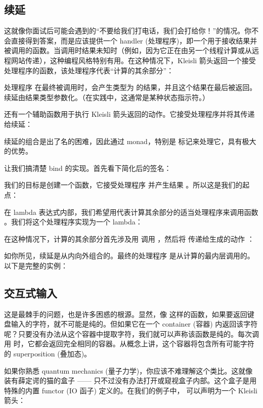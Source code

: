 \subsection{续延}

这就像你面试后可能会遇到的“不要给我们打电话，我们会打给你！”的情况。你不会直接得到答案，而是应该提供一个 handler (处理程序)，即一个用于接收结果并被调用的函数。当调用时结果未知时（例如，因为它正在由另一个线程计算或从远程网站传递），这种编程风格特别有用。在这种情况下，Kleisli 箭头返回一个接受处理程序的函数，该处理程序代表“计算的其余部分”：

处理程序  在最终被调用时，会产生类型为  的结果，并且这个结果在最后被返回。续延由结果类型参数化。（在实践中，这通常是某种状态指示符。）

还有一个辅助函数用于执行 Kleisli 箭头返回的动作。它接受处理程序并将其传递给续延：

续延的组合是出了名的困难，因此通过 monad，特别是  标记来处理它，具有极大的优势。

让我们搞清楚 bind 的实现。首先看下简化后的签名：

我们的目标是创建一个函数，它接受处理程序  并产生结果 。所以这是我们的起点：

在 lambda 表达式内部，我们希望用代表计算其余部分的适当处理程序来调用函数 。我们将这个处理程序实现为一个 lambda：

在这种情况下，计算的其余部分首先涉及用  调用 ，然后将  传递给生成的动作 ：

如你所见，续延是从内向外组合的。最终的处理程序  是从计算的最内层调用的。以下是完整的实例：


\subsection{交互式输入}

这是最棘手的问题，也是许多困惑的根源。显然，像  这样的函数，如果要返回键盘输入的字符，就不可能是纯的。但如果它在一个 container (容器) 内返回该字符呢？只要没有办法从这个容器中提取字符，我们就可以声称该函数是纯的。每次调用  时，它都会返回完全相同的容器。从概念上讲，这个容器将包含所有可能字符的 superposition (叠加态)。

如果你熟悉 quantum mechanics (量子力学)，你应该不难理解这个类比。这就像装有薛定谔的猫的盒子 —— 只不过没有办法打开或窥视盒子内部。这个盒子是用特殊的内置  functor (IO 函子) 定义的。在我们的例子中， 可以声明为一个 Kleisli 箭头：

